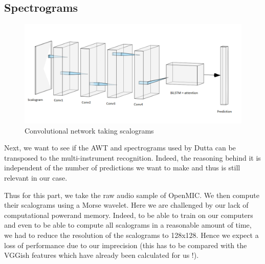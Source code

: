 \documentclass[final]{cvpr}
\begin{document}
\subsection{Spectrograms}
\begin{figure}
	\centering
	\includegraphics[scale = 0.65]{cnn.png}
	\caption{Convolutional network taking scalograms}
	\label{cnn}
\end{figure}
Next, we want to see if the AWT and spectrograms used by Dutta \etal can be transposed to the multi-instrument recognition. Indeed, the reasoning behind it is independent of the number of predictions we want to make and thus is still relevant in our case. 

Thus for this part, we take the raw audio sample of OpenMIC. We then compute their scalograms using a Morse wavelet. Here we are challenged by our lack of computational powerand memory. Indeed, to be able to train on our computers and even to be able to compute all scalograms in a reasonable amount of time, we had to reduce the resolution of the scalograms to 128x128. Hence we expect a loss of performance due to our imprecision (this has to be compared with the VGGish features which have already been calculated for us !).
\end{document}
